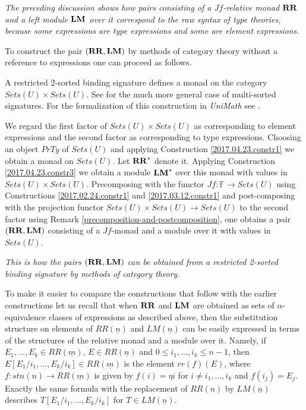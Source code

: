 \documentclass[onecolumn,12pt]{amsart}
\numberwithin{proposition}{subsection}
\newcommand{\sr}{\rightarrow}
\newcommand{\uu}{\underline}
\newcommand{\RR}{{\bf RR}}
\newcommand{\LM}{{\bf LM}}
\newcommand{\FF}{{\mathbb F}}
\newcommand{\ff}[1]{\uu{#1}}
\begin{document}
{\em The preceding discussion shows how pairs consisting of a $Jf$-relative monad $\RR$
  and a left module $\LM$ over it correspond to the raw syntax of type theories,
  because some expressions are type expressions and some are element
  expressions.}

To construct the pair $(\RR,\LM)$ by methods of category theory without a
reference to expressions one can proceed as follows.

A restricted 2-sorted binding signature defines a monad on the category
$Sets(U)\times Sets(U)$.  See \cite{Zsido} for the much more general case of multi-sorted
signatures. For the formalization of this construction in {\em UniMath} see
\cite{DBLP:conf/cpp/AhrensMM22}.

We regard the first factor of $Sets(U)\times Sets(U)$ as corresponding to element expressions
and the second factor as corresponding to type expressions.
Choosing an object $PrTy$ of $Sets(U)$ and applying Construction
\ref{2017.04.23.constr1} we obtain a monad on $Sets(U)$. Let
$\RR^*$ denote it.  Applying Construction \ref{2017.04.23.constr3} we obtain a module
$\LM^*$ over this monad with values in $Sets(U) \times Sets(U)$.  Precomposing with the
functor $Jf:\FF\sr Sets(U)$ using Constructions \ref{2017.02.24.constr1} and
\ref{2017.03.12.constr1} and post-composing with the projection functor
$Sets(U) \times Sets (U) \to Sets(U)$ to the second factor using Remark \ref{precomposition-and-postcomposition},
one obtains a pair $(\RR,\LM)$ consisting of a $Jf$-monad and a
module over it with values in $Sets(U)$.

{\em This is how the pairs $(\RR,\LM)$ can be obtained from a restricted
  2-sorted binding signature by methods of category theory.}

To make it easier to compare the constructions that follow with the earlier
constructions let us recall that when $\RR$ and $\LM$ are obtained as sets
of $\alpha$-equivalence classes of expressions as described above, then the
substitution structure on elements of $RR(\ff{n})$ and $LM(\ff{n})$ can be
easily expressed in terms of the structures of the relative monad and a module
over it.  Namely, if $E_1,\dots,E_k\in RR(\ff{m})$, 
$E\in RR(\ff{n})$ and $0\le i_1,\dots,i_k\le n-1$, then 
$E[E_1/i_1,\dots,E_k/i_k]\in RR(\ff{m})$ is the element $rr(f)(E)$, where $f:stn(n)\sr RR(\ff{m})$ is given
by $f(i)=\eta{i}$ for $i\ne i_1,\dots,i_k$ and $f(i_j)=E_j$. Exactly the same
formula with the replacement of $RR(n)$ by $LM(\ff{n})$ describes
$T[E_1/i_1,\dots,E_k/i_k]$ for $T\in LM(\ff{n})$.
\end{document}
